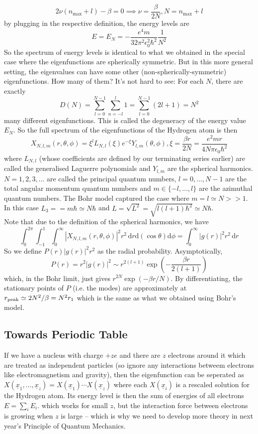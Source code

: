 $$2\nu(n_{\max{}}+l)-\beta=0\implies \nu=\frac{\beta}{2N},N=n_{\max{}}+l$$
by plugging in the respective definition, the energy levels are
$$E=E_N=-\frac{e^4m}{32\pi^2\epsilon_0^2\hbar^2}\frac{1}{N^2}$$
So the spectrum of energy levels is identical to what we obtained in the special case where the eigenfunctions are spherically symmetric.
But in this more general setting, the eigenvalues can have some other (non-spherically-symmetric) eigenfunctions.
How many of them?
It's not hard to see:
For each $N$, there are exactly
$$D(N)=\sum_{l=0}^{N-1}\sum_{n=-l}^l1=\sum_{l=0}^{N-1}(2l+1)=N^2$$
many different eigenfunctions.
This is called the degeneracy of the energy value $E_N$.
So the full spectrum of the eigenfunctions of the Hydrogen atom is then
$$X_{N,l,m}(r,\theta,\phi)=\xi^lL_{N,l}(\xi)e^{-\xi}Y_{l,m}(\theta,\phi),\xi=\frac{\beta r}{2N}=\frac{e^2mr}{4N\pi\epsilon_0\hbar^2}$$
where $L_{N,l}$ (whose coefficients are defined by our terminating series earlier) are called the generalised Laguerre polynomials and $Y_{l,m}$ are the spherical harmonics.\\
$N=1,2,3,\ldots$ are called the principal quantum numbers, $l=0,\ldots,N-1$ are the total angular momentum quantum numbers and $m\in\{-l,\ldots,l\}$ are the azimuthal quantum numbers.
The Bohr model captured the case where $m=l\simeq N>>1$.
In this case $L_3==m\hbar\simeq N\hbar$ and $L=\sqrt{L^2}=\sqrt{l(l+1)\hbar^2}\simeq N\hbar$.\\
Note that due to the definition of the spherical harmonics, we have
$$\int_0^{2\pi}\int_{-1}^1\int_0^\infty |X_{N,l,m}(r,\theta,\phi)|^2r^2\,\mathrm dr\mathrm d(\cos\theta)\mathrm d\phi=\int_0^\infty |g(r)|^2r^2\,\mathrm dr$$
So we define $P(r)|g(r)|^2r^2$ as the radial probability.
Asymptotically,
$$P(r)=r^2|g(r)|^2\sim r^{2(l+1)}\exp\left( -\frac{\beta r}{2(l+1)} \right)$$
which, in the Bohr limit, just gives $r^{2N}\exp(-\beta r/N)$.
By differentiating, the stationary points of $P$ (i.e. the modes) are approximately at $r_{\rm peak}\simeq 2N^2/\beta=N^2r_1$ which is the same as what we obtained using Bohr's model.
\subsection{Towards Periodic Table}
If we have a nucleus with charge $+ze$ and there are $z$ electrons around it which are treated as independent particles (so ignore any interactions betweem electrons like electromagnetism and gravity), then the eigenfunction can be seperated as $X(\underline{x}_1,\ldots,\underline{x}_z)=X(\underline{x}_1)\cdots X(\underline{x}_z)$ where each $X(\underline{x}_i)$ is a rescaled solution for the Hydrogen atom.
Its energy level is then the sum of energies of all electrons $E=\sum_iE_i$.
which works for small $z$, but the interaction force between electrons is growing when $z$ is large -- which is why we need to develop more theory in next year's Principle of Quantum Mechanics.